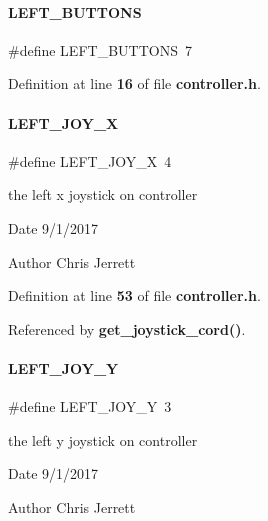 \paragraph{L\+E\+F\+T\+\_\+\+B\+U\+T\+T\+O\+NS}
{\footnotesize\ttfamily \#define L\+E\+F\+T\+\_\+\+B\+U\+T\+T\+O\+NS~7}



Definition at line \textbf{ 16} of file \textbf{ controller.\+h}.

\mbox{\label{controller_8h_ac055a23829dc64aa20b8e2e1bcfbf316}} 
\paragraph{L\+E\+F\+T\+\_\+\+J\+O\+Y\+\_\+X}
{\footnotesize\ttfamily \#define L\+E\+F\+T\+\_\+\+J\+O\+Y\+\_\+X~4}



the left x joystick on controller 

\begin{DoxyDate}{Date}
9/1/2017 
\end{DoxyDate}
\begin{DoxyAuthor}{Author}
Chris Jerrett 
\end{DoxyAuthor}


Definition at line \textbf{ 53} of file \textbf{ controller.\+h}.



Referenced by \textbf{ get\+\_\+joystick\+\_\+cord()}.

\mbox{\label{controller_8h_ae0a2b64db5fc4f4bf4b169185be93db3}} 
\paragraph{L\+E\+F\+T\+\_\+\+J\+O\+Y\+\_\+Y}
{\footnotesize\ttfamily \#define L\+E\+F\+T\+\_\+\+J\+O\+Y\+\_\+Y~3}



the left y joystick on controller 

\begin{DoxyDate}{Date}
9/1/2017 
\end{DoxyDate}
\begin{DoxyAuthor}{Author}
Chris Jerrett 
\end{DoxyAuthor}


